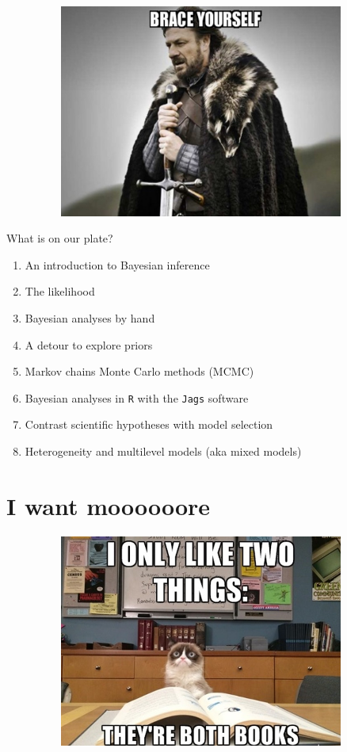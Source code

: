 \documentclass[
  ignorenonframetext,
  aspectratio=169]{beamer}
\providecommand{\tightlist}{%
  \setlength{\itemsep}{0pt}\setlength{\parskip}{0pt}}
\begin{document}
\begin{frame}
\begin{center}\includegraphics[width=13cm,height=7cm]{img/brace_yourself} \end{center}
\end{frame}

\begin{frame}[fragile]{What is on our plate?}
\protect\hypertarget{what-is-on-our-plate}{}
\begin{enumerate}
\tightlist
\item
  An introduction to Bayesian inference
\item
  The likelihood
\item
  Bayesian analyses by hand
\item
  A detour to explore priors
\item
  Markov chains Monte Carlo methods (MCMC)
\item
  Bayesian analyses in \texttt{R} with the \texttt{Jags} software
\item
  Contrast scientific hypotheses with model selection
\item
  Heterogeneity and multilevel models (aka mixed models)
\end{enumerate}
\end{frame}

\hypertarget{i-want-moooooore}{%
\section{I want moooooore}\label{i-want-moooooore}}

\begin{frame}
\begin{center}\includegraphics[width=13cm,height=7cm]{img/books} \end{center}
\end{frame}
\end{document}
